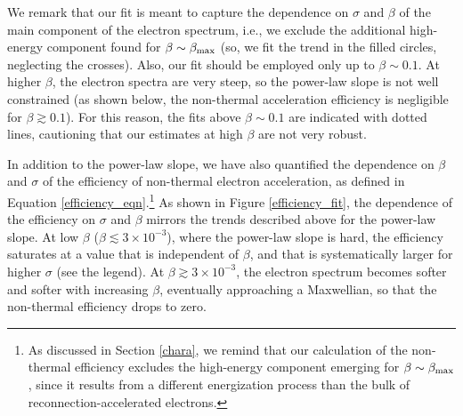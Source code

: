 We remark that our fit is meant to capture the dependence on $\sigma$ and $\beta$ of the main component of the electron spectrum, i.e., we exclude the additional high-energy component found for $\beta\sim\beta_{\rm max}$ (so, we fit the trend in the filled circles, neglecting the crosses). Also, our fit should be employed only up to $\beta\sim 0.1$. At higher $\beta$, the electron spectra are very steep, so the power-law slope is not well constrained (as shown below, the non-thermal acceleration efficiency is negligible for $\beta\gtrsim 0.1$). For this reason, the fits above $\beta\sim0.1$ are indicated with dotted lines,  cautioning that our estimates at high $\beta$ are not very robust. 


In addition to the power-law slope, we have also quantified the dependence on $\beta$ and $\sigma$ of the efficiency of non-thermal electron acceleration, as defined in Equation \ref{efficiency_eqn}.\footnote{As discussed in Section \ref{chara}, we remind that our calculation of the non-thermal efficiency excludes the high-energy component emerging for $\beta\sim \beta_{\rm max}$, since it results from a different energization process than the bulk of reconnection-accelerated electrons.} As shown in Figure \ref{efficiency_fit}, the dependence of the efficiency on $\sigma$ and $\beta$ mirrors the trends described above for the power-law slope. At low $\beta$ ($\beta \lesssim 3 \times 10^{-3}$), where the power-law slope is hard, the efficiency saturates at a value that is independent of $\beta$, and that is systematically larger for higher $\sigma$ (see the legend). At $\beta \gtrsim 3 \times 10^{-3}$, the electron spectrum becomes softer and softer with increasing $\beta$, eventually approaching a Maxwellian, so that the non-thermal efficiency drops to zero.

